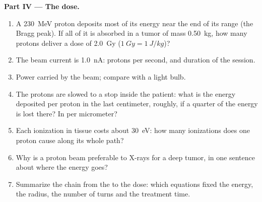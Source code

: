 \begin{problem}
\medskip
\noindent\textbf{Part IV --- The dose.}
\begin{enumerate}[resume]
  \item A \qty{230}{MeV} proton deposits most of its energy near the end
        of its range (the Bragg peak). If all of it is absorbed in a
        tumor of mass \qty{0.50}{kg}, how many protons deliver a dose of
        \qty{2.0}{Gy} ($\qty{1}{Gy} = \qty{1}{J/kg}$)?
  \item The beam current is \qty{1.0}{nA}: protons per second, and
        duration of the session.
  \item Power carried by the beam; compare with a light bulb.
  \item The protons are slowed to a stop inside the patient: what is the
        energy deposited per proton in the last centimeter, roughly, if
        a quarter of the energy is lost there? In  per
        micrometer?
  \item Each ionization in tissue costs about \qty{30}{eV}: how many
        ionizations does one proton cause along its whole path?
  \item Why is a proton beam preferable to X-rays for a deep tumor, in
        one sentence about where the energy goes?
  \item Summarize the chain from the  to the dose: which
        equations fixed the energy, the radius, the number of turns and
        the treatment time.
\end{enumerate}
\end{problem}
